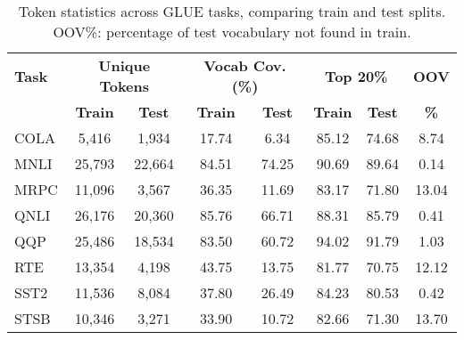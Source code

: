 \begin{table}[htbp]
\centering
\scriptsize
\setlength{\tabcolsep}{3pt}
\begin{tabular}{l|cc|cc|cc|c}
\toprule
\textbf{Task} & \multicolumn{2}{c|}{\textbf{Unique Tokens}} & \multicolumn{2}{c|}{\textbf{Vocab Cov. (\%)}} & \multicolumn{2}{c|}{\textbf{Top 20\%}} & \textbf{OOV} \\
 & \textbf{Train} & \textbf{Test} & \textbf{Train} & \textbf{Test} & \textbf{Train} & \textbf{Test} & \textbf{\%} \\
\midrule
COLA & 5,416 & 1,934 & 17.74 & 6.34 & 85.12 & 74.68 & 8.74 \\
MNLI & 25,793 & 22,664 & 84.51 & 74.25 & 90.69 & 89.64 & 0.14 \\
MRPC & 11,096 & 3,567 & 36.35 & 11.69 & 83.17 & 71.80 & 13.04 \\
QNLI & 26,176 & 20,360 & 85.76 & 66.71 & 88.31 & 85.79 & 0.41 \\
QQP & 25,486 & 18,534 & 83.50 & 60.72 & 94.02 & 91.79 & 1.03 \\
RTE & 13,354 & 4,198 & 43.75 & 13.75 & 81.77 & 70.75 & 12.12 \\
SST2 & 11,536 & 8,084 & 37.80 & 26.49 & 84.23 & 80.53 & 0.42 \\
STSB & 10,346 & 3,271 & 33.90 & 10.72 & 82.66 & 71.30 & 13.70 \\
\bottomrule
\end{tabular}
\caption{Token statistics across GLUE tasks, comparing train and test splits. OOV\%: percentage of test vocabulary not found in train.}
\label{tab:token_statistics}
\end{table}